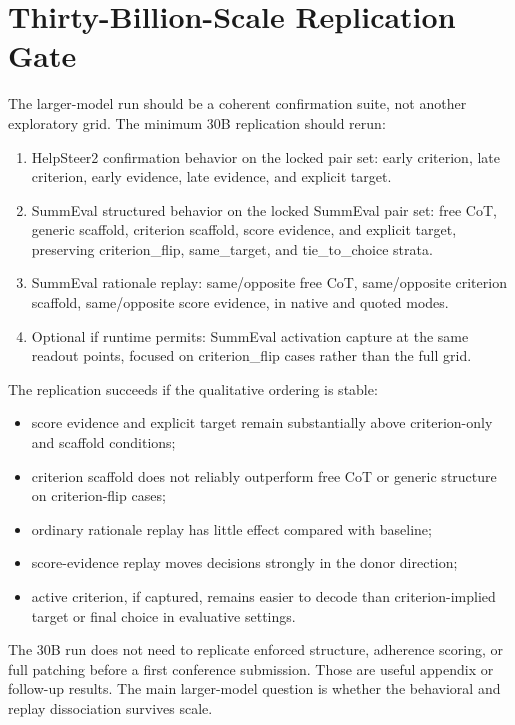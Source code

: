 \documentclass[11pt]{article}
\begin{document}
\section{Thirty-Billion-Scale Replication Gate}

The larger-model run should be a coherent confirmation suite, not another
exploratory grid. The minimum 30B replication should rerun:

\begin{enumerate}[leftmargin=0.7cm]
\item HelpSteer2 confirmation behavior on the locked pair set:
early criterion, late criterion, early evidence, late evidence, and explicit
target.
\item SummEval structured behavior on the locked SummEval pair set:
free CoT, generic scaffold, criterion scaffold, score evidence, and explicit
target, preserving criterion\_flip, same\_target, and tie\_to\_choice strata.
\item SummEval rationale replay:
same/opposite free CoT, same/opposite criterion scaffold, same/opposite score
evidence, in native and quoted modes.
\item Optional if runtime permits: SummEval activation capture at the same
readout points, focused on criterion\_flip cases rather than the full grid.
\end{enumerate}

The replication succeeds if the qualitative ordering is stable:

\begin{itemize}[leftmargin=0.7cm]
\item score evidence and explicit target remain substantially above
criterion-only and scaffold conditions;
\item criterion scaffold does not reliably outperform free CoT or generic
structure on criterion-flip cases;
\item ordinary rationale replay has little effect compared with baseline;
\item score-evidence replay moves decisions strongly in the donor direction;
\item active criterion, if captured, remains easier to decode than
criterion-implied target or final choice in evaluative settings.
\end{itemize}

The 30B run does not need to replicate enforced structure, adherence scoring,
or full patching before a first conference submission. Those are useful
appendix or follow-up results. The main larger-model question is whether the
behavioral and replay dissociation survives scale.
\end{document}
